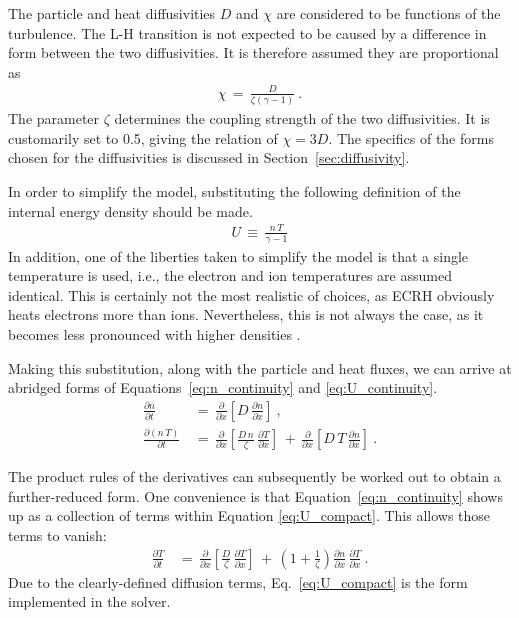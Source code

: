 The particle and heat diffusivities $D$ and $\chi$ are considered to be functions of the turbulence.
The L-H transition is not expected to be caused by a difference in form between the two diffusivities.
It is therefore assumed they are proportional as 
\begin{align} %
	\chi \,=\, \frac{D}{\zeta (\gamma - 1)} \label{eq:heat_particle_diff_relation}~.
\end{align}
The parameter $\zeta$ determines the coupling strength of the two diffusivities.
It is customarily set to 0.5, giving the relation of $\chi = 3 D$.
The specifics of the forms chosen for the diffusivities is discussed in Section~\ref{sec:diffusivity}.

In order to simplify the model, substituting the following definition of the internal energy density should be made.
\begin{align} %
	U \,\equiv\, \frac{n \, T}{\gamma - 1} \label{eq:U_definition}
\end{align}
In addition, one of the liberties taken to simplify the model is that a single temperature is used, i.e., the electron and ion temperatures are assumed identical.
This is certainly not the most realistic of choices, as ECRH obviously heats electrons more than ions.
Nevertheless, this is not always the case, as it becomes less pronounced with higher densities \cite{sauter_l--_2012}.

Making this substitution, along with the particle and heat fluxes, we can arrive at abridged forms of Equations~\ref{eq:n_continuity} and \ref{eq:U_continuity}.
\begin{align} %
	\frac{\partial n}{\partial t} \,&=\, \frac{\partial}{\partial x} \left[D \,
		\frac{\partial n}{\partial x}\right]~,\label{eq:n_compact} \\
	\frac{\partial(n\,T)}{\partial t} \,&=\, \frac{\partial}{\partial x}
		\left[\frac{D\,n}{\zeta} \, \frac{\partial T}{\partial x}\right]
		\,+\, \frac{\partial}{\partial x} \left[D\,T \,
		\frac{\partial n}{\partial x}\right]~. \label{eq:U_compact}
\end{align}

The product rules of the derivatives can subsequently be worked out to obtain a further-reduced form.
One convenience is that Equation~\ref{eq:n_continuity} shows up as a collection of terms within Equation \ref{eq:U_compact}.
This allows those terms to vanish:
\begin{align} %
	\frac{\partial T}{\partial t} \,&=\, \frac{\partial}{\partial x}
		\left[\frac{D}{\zeta} \, \frac{\partial T}{\partial x}\right] \,+\,
		\left(1 + \frac{1}{\zeta}\right) \frac{\partial n}{\partial x} \,
		\frac{\partial T}{\partial x}~. \label{eq:T_compact}
\end{align}
Due to the clearly-defined diffusion terms, Eq.~\ref{eq:U_compact} is the form implemented in the solver.

